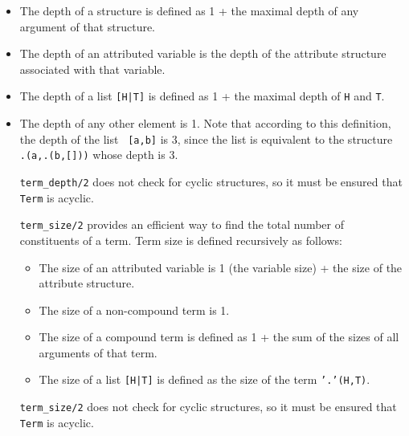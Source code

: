\begin{description}
\begin{itemize}
    Collects the variables in {\tt Term} into the list {\tt
    VariableList}.  The variables are in the order of their first
    occurrences in a depth-first traversal of {\tt Term}.

%
    {\tt term\_depth/2} provides an efficient way to find the maximal
    depth of a term.  Term depth is defined recursively as follows:
%
\bi
\item The depth of a structure is defined as 1 + the maximal depth of
  any argument of that structure.
\item The depth of an attributed variable is the depth of the
  attribute structure associated with that variable.
\item The depth of a list {\tt [H|T]} is defined as 1 + the maximal
  depth of {\tt H} and {\tt T}.
\item The depth of any other element is 1.
\ei
%
Note that according to this definition, the depth of the list {\tt
  [a,b]} is 3, since the list is equivalent to the structure {\tt
  .(a,.(b,[]))} whose depth is 3.  

{\tt term\_depth/2} does not check for cyclic structures, so it must
be ensured that {\tt Term} is acyclic.

%
{\tt term\_size/2} provides an efficient way to find the total number
of constituents of a term. Term size is defined recursively as
follows:
\begin{itemize}
\item The size of an attributed variable is 1 (the variable size) +
  the size of the attribute structure.
\item The size of a non-compound term is 1.
\item The size of a compound term is defined as 1 + the sum of the
  sizes of all arguments of that term.  
\item The size of a list {\tt [H|T]} is defined as the size of the
  term {\tt '.'(H,T)}.
\end{itemize}
{\tt term\_size/2} does not check for cyclic structures, so it must be
ensured that {\tt Term} is acyclic.


\end{itemize}
\end{description}
